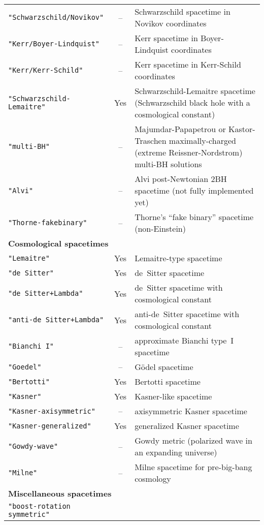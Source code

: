 \begin{table}[htbp]
\begin{center}
\begin{tabular}{@{\qquad}lcp{80mm}}
{\tt "Schwarzschild/Novikov"}
	& --	& Schwarzschild spacetime in Novikov coordinates	\\
{\tt "Kerr/Boyer-Lindquist"}
	& --	& Kerr spacetime in Boyer-Lindquist coordinates		\\
{\tt "Kerr/Kerr-Schild"}
	& --	& Kerr spacetime in Kerr-Schild coordinates		\\
{\tt "Schwarzschild-Lemaitre"}
	& Yes	& Schwarzschild-Lemaitre spacetime (Schwarzschild
		  black hole with a cosmological constant)		\\
{\tt "multi-BH"}
	& --	& Majumdar-Papapetrou or Kastor-Traschen
		  maximally-charged (extreme Reissner-Nordstrom)
		  multi-BH solutions					\\
{\tt "Alvi"}
	& --	& Alvi post-Newtonian 2BH spacetime
		  (not fully implemented yet)				\\
{\tt "Thorne-fakebinary"}
	& --	& Thorne's ``fake binary'' spacetime (non-Einstein)	\\[1ex]
%
\multicolumn{3}{l}{\bf Cosmological spacetimes}				\\
{\tt "Lemaitre"}
	& Yes	& Lemaitre-type spacetime				\\
{\tt "de Sitter"}
	& Yes	& de~Sitter spacetime					\\
{\tt "de Sitter+Lambda"}
	& Yes	& de~Sitter spacetime with cosmological constant	\\
{\tt "anti-de Sitter+Lambda"}
	& Yes	& anti-de~Sitter spacetime with cosmological constant	\\
{\tt "Bianchi I"}
	& --	& approximate Bianchi type~I spacetime			\\
{\tt "Goedel"}
	& --	& G\"{o}del spacetime					\\
{\tt "Bertotti"}
	& Yes	& Bertotti spacetime					\\
{\tt "Kasner"}
	& Yes	& Kasner-like spacetime					\\
{\tt "Kasner-axisymmetric"}
	& --	& axisymmetric Kasner spacetime				\\
{\tt "Kasner-generalized"}
	& Yes	& generalized Kasner spacetime				\\
{\tt "Gowdy-wave"}
	& --	& Gowdy metric (polarized wave in an expanding universe)\\
{\tt "Milne"}
	& --	& Milne spacetime for pre-big-bang cosmology		\\[1ex]
%
\multicolumn{3}{l}{\bf Miscellaneous spacetimes}			\\
{\tt "boost-rotation symmetric"}

\end{tabular}
\end{center}
\end{table}
